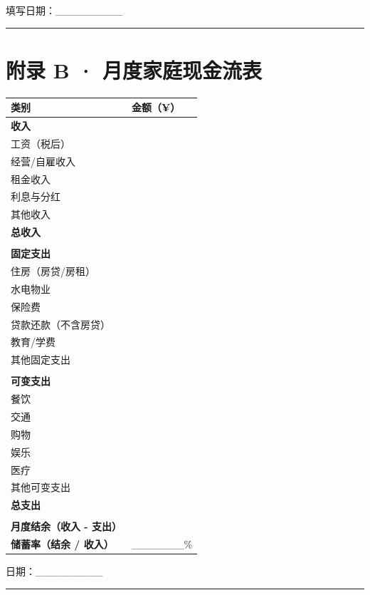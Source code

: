 \documentclass[a4paper,11pt,oneside,fontset=none,UTF8,zihao=-4]{ctexbook}
\begin{document}
填写日期：\_\_\_\_\_\_\_\_\_

\begin{center}{\color{dh-bronze}\rule{0.2\textwidth}{0.5pt}}\end{center}

\section{附录 B ·
月度家庭现金流表}\label{ux9644ux5f55-b-ux6708ux5ea6ux5bb6ux5eadux73b0ux91d1ux6d41ux8868}

\begin{longtable}[]{@{}ll@{}}
\toprule\noalign{}\rowcolor{dh-pink!25}
类别 & 金额（¥） \\
\midrule\noalign{}
\endhead
\bottomrule\noalign{}
\endlastfoot
\textbf{收入} & \\
工资（税后） & \\
经营/自雇收入 & \\
租金收入 & \\
利息与分红 & \\
其他收入 & \\
\textbf{总收入} & \\
& \\
\textbf{固定支出} & \\
住房（房贷/房租） & \\
水电物业 & \\
保险费 & \\
贷款还款（不含房贷） & \\
教育/学费 & \\
其他固定支出 & \\
& \\
\textbf{可变支出} & \\
餐饮 & \\
交通 & \\
购物 & \\
娱乐 & \\
医疗 & \\
其他可变支出 & \\
\textbf{总支出} & \\
& \\
\textbf{月度结余（收入 - 支出）} & \\
\textbf{储蓄率（结余 / 收入）} & \_\_\_\_\_\_\_\% \\
\end{longtable}

日期：\_\_\_\_\_\_\_\_\_

\begin{center}{\color{dh-bronze}\rule{0.2\textwidth}{0.5pt}}\end{center}
\end{document}

